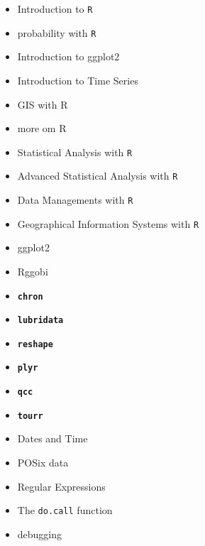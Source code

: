 
\begin{itemize}
\item Introduction to \texttt{R}
\item probability with \texttt{R}
\item Introduction to ggplot2
\item Introduction to Time Series
\item GIS with R
\item more om R

\end{itemize}




\begin{itemize}
\item Statistical Analysis with \texttt{R}
\item Advanced Statistical Analysis with \texttt{R}
\item Data Managements with \texttt{R}
\item Geographical Information Systems with \texttt{R}
\item ggplot2 
\item Rggobi
\end{itemize}
\begin{itemize}
\item \textbf{\texttt{chron}}
\item \textbf{\texttt{lubridata}}
\item \textbf{\texttt{reshape}}
\item \textbf{\texttt{plyr}}
\item \textbf{\texttt{qcc}}
\item \textbf{\texttt{tourr}}
\end{itemize}
\begin{itemize}
\item Dates and Time
\item POSix data
\item Regular Expressions
\item The \texttt{do.call} function
\item debugging
\end{itemize}

